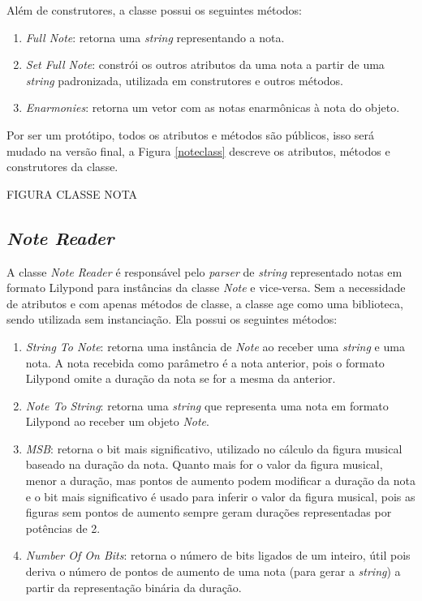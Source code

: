       Além de construtores, a classe possui os seguintes métodos:

      \begin{enumerate}
        \item \textit{Full Note}: retorna uma \textit{string} representando a nota.
        \item \textit{Set Full Note}: constrói os outros atributos da uma nota a partir de uma \textit{string} padronizada, utilizada em construtores e outros métodos.
        \item \textit{Enarmonies}: retorna um vetor com as notas enarmônicas à nota do objeto.
      \end{enumerate}

      Por ser um protótipo, todos os atributos e métodos são públicos, isso será mudado na versão final, a Figura \ref{noteclass} descreve os atributos, métodos e construtores da classe.

      FIGURA CLASSE NOTA

    \subsection[\textit{Note Reader}]{\textit{Note Reader}}


      A classe \textit{Note Reader} é responsável pelo \textit{parser} de \textit{string} representado notas em formato Lilypond para instâncias da classe \textit{Note} e vice-versa. Sem a necessidade de atributos e com apenas métodos de classe, a classe age como uma biblioteca, sendo utilizada sem instanciação. Ela possui os seguintes métodos:


      \begin{enumerate}
        \item \textit{String To Note}: retorna uma instância de \textit{Note} ao receber uma \textit{string} e uma nota. A nota recebida como parâmetro é a nota anterior, pois o formato Lilypond omite a duração da nota se for a mesma da anterior.
        \item \textit{Note To String}: retorna uma \textit{string} que representa uma nota em formato Lilypond ao receber um objeto \textit{Note}.
        \item \textit{MSB}: retorna o bit mais significativo, utilizado no cálculo da figura musical baseado na duração da nota. Quanto mais for o valor da figura musical, menor a duração, mas pontos de aumento podem modificar a duração da nota e o bit mais significativo é usado para inferir o valor da figura musical, pois as figuras sem pontos de aumento sempre geram durações representadas por potências de 2.
        \item \textit{Number Of On Bits}: retorna o número de bits ligados de um inteiro, útil pois deriva o número de pontos de aumento de uma nota (para gerar a \textit{string}) a partir da representação binária da duração.
      \end{enumerate}

